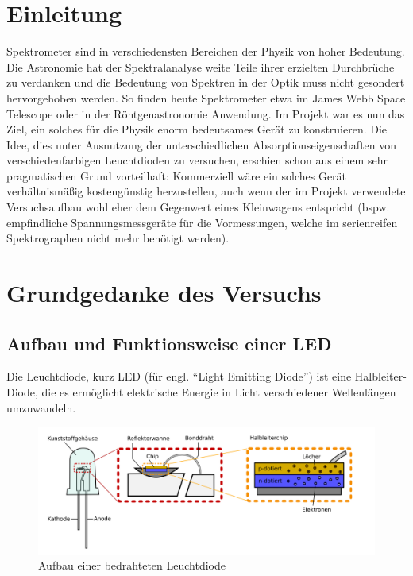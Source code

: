 \documentclass[11pt]{scrartcl}
\begin{document}
\section{Einleitung} %
Spektrometer sind in verschiedensten Bereichen der Physik von hoher Bedeutung. Die Astronomie hat der Spektralanalyse weite Teile ihrer erzielten Durchbrüche zu verdanken und die Bedeutung von Spektren in der Optik muss nicht gesondert hervorgehoben werden. So finden heute  Spektrometer etwa im James Webb Space Telescope oder in der Röntgenastronomie Anwendung. Im Projekt war es nun das Ziel, ein solches für die Physik enorm bedeutsames Gerät zu konstruieren. Die Idee, dies unter Ausnutzung der unterschiedlichen Absorptionseigenschaften von verschiedenfarbigen Leuchtdioden zu versuchen, erschien schon aus einem sehr pragmatischen Grund vorteilhaft: Kommerziell wäre ein solches Gerät verhältnismäßig kostengünstig herzustellen, auch wenn der im Projekt verwendete Versuchsaufbau wohl eher dem Gegenwert eines Kleinwagens entspricht (bspw. empfindliche Spannungsmessgeräte für die Vormessungen, welche im serienreifen Spektrographen nicht mehr benötigt werden).



\section{Grundgedanke des Versuchs}


\subsection{Aufbau und Funktionsweise einer LED}
Die Leuchtdiode, kurz LED (für engl. "`Light Emitting Diode"') ist eine Halbleiter-Diode, die es ermöglicht elektrische Energie in Licht verschiedener Wellenlängen umzuwandeln.

\begin{figure}[ht]
\begin{center}
\includegraphics[width=1\textwidth]{ledaufbau.png}
\end{center}
\vspace{-1.5\baselineskip}
\caption{Aufbau einer bedrahteten Leuchtdiode}
\label{LED-Aufbau}
\end{figure}
\end{document}
